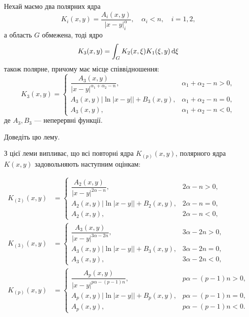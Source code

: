 \begin{lemma}
	\label{lemma:2.1.25}
	Нехай маємо два полярних ядра 
	\begin{equation}
		K_i(x, y) = \frac{A_i(x, y)}{|x - y|^\alpha_i}, \quad \alpha_i < n, \quad i = 1, 2,
	\end{equation}
	а область $G$ обмежена, тоді ядро 
	\begin{equation}
		K_3(x, y) = \int_G K_2(x, \xi) K_1(\xi, y) \mathop{}\!\mathrm{d} \xi
	\end{equation}
	також полярне, причому має місце співвідношення:
	\begin{equation}
		K_3(x, y) = \begin{cases}
			\dfrac{A_3(x, y)}{|x - y|^{\alpha_1 + \alpha_2 - n}}, & \alpha_1 + \alpha_2 - n > 0, \\
			A_3(x, y) \big|\ln|x - y|\big| + B_3(x, y), & \alpha_1 + \alpha_2 - n = 0, \\
			A_3(x, y), & \alpha_1 + \alpha_2 - n < 0,
		\end{cases}
	\end{equation}
	де $A_3, B_3$ --- неперервні функції.
\end{lemma}

\begin{exercise}
	Доведіть цю лему.
\end{exercise}

З цієї леми випливає, що всі повторні ядра $K_{(p)}(x, y)$, полярного ядра $K(x, y)$ задовольняють наступним оцінкам:

\begin{equation}
	\begin{aligned}
		K_{(2)}(x, y) &= \begin{cases}
			\dfrac{A_2(x, y)}{|x - y|^{2\alpha - n}}, & 2\alpha - n > 0, \\
			A_2(x, y) \big|\ln|x - y|\big| + B_2(x, y), & 2\alpha - n = 0, \\
			A_2(x, y), & 2\alpha - n < 0,
		\end{cases} \\
		K_{(3)}(x, y) &= \begin{cases}
			\dfrac{A_3(x, y)}{|x - y|^{3\alpha - 2n}}, & 3\alpha - 2n > 0, \\
			A_3(x, y) \big|\ln|x - y|\big| + B_3(x, y), & 3\alpha - 2n = 0, \\
			A_3(x, y), & 3\alpha - 2n < 0,
		\end{cases} \\
		K_{(p)}(x, y) &= \begin{cases}
			\dfrac{A_p(x, y)}{|x - y|^{p\alpha - (p-1)n}}, & p\alpha - (p - 1)n > 0, \\
			A_p(x, y) \big|\ln|x - y|\big| + B_p(x, y), & p\alpha - (p - 1)n = 0, \\
			A_p(x, y), & p\alpha - (p - 1)n < 0.
		\end{cases}
	\end{aligned}
\end{equation}

